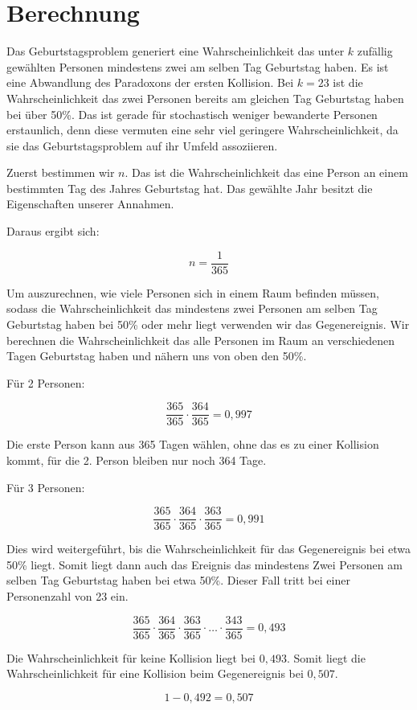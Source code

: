 \documentclass[../main.tex]{subfiles}
\begin{document}
    \section{Berechnung}

    Das Geburtstagsproblem generiert eine Wahrscheinlichkeit das unter \(k\) zufällig gewählten Personen mindestens zwei am
    selben Tag Geburtstag haben. Es ist eine Abwandlung des Paradoxons der ersten Kollision. \cite{henze} Bei \(k=23\) ist die
    Wahrscheinlichkeit das zwei Personen bereits am gleichen Tag Geburtstag haben bei über 50\%. Das ist gerade für
    stochastisch weniger bewanderte Personen erstaunlich, denn diese vermuten eine sehr viel geringere Wahrscheinlichkeit,
    da sie das Geburtstagsproblem auf ihr Umfeld assoziieren.

    Zuerst bestimmen wir \(n\).
    Das ist die Wahrscheinlichkeit das eine Person an einem bestimmten Tag des Jahres Geburtstag hat.
    Das gewählte Jahr besitzt die Eigenschaften unserer Annahmen.

    Daraus ergibt sich:

    \begin{equation}
        n = \frac{1}{365}
    \end{equation}

    Um auszurechnen, wie viele Personen sich in einem Raum befinden müssen, sodass die Wahrscheinlichkeit
    das mindestens zwei Personen am selben Tag Geburtstag haben bei 50\% oder mehr liegt verwenden wir das Gegenereignis.
    Wir berechnen die Wahrscheinlichkeit das alle Personen im Raum an verschiedenen Tagen Geburtstag haben und nähern uns
    von oben den 50\%.

    Für 2 Personen:

    \begin{equation}
        \frac{365}{365} \cdot \frac{364}{365} = 0,997
    \end{equation}

    Die erste Person kann aus 365 Tagen wählen, ohne das es zu einer Kollision kommt, für die 2. Person bleiben nur noch 364 Tage.

    Für 3 Personen:

    \begin{equation}
        \frac{365}{365} \cdot \frac{364}{365} \cdot \frac{363}{365} = 0,991
    \end{equation}

    Dies wird weitergeführt, bis die Wahrscheinlichkeit für das Gegenereignis bei etwa 50\% liegt.
    Somit liegt dann auch das Ereignis das mindestens Zwei Personen am selben Tag Geburtstag haben bei etwa 50\%.
    Dieser Fall tritt bei einer Personenzahl von 23 ein.

    \begin{equation}
        \frac{365}{365} \cdot \frac{364}{365} \cdot \frac{363}{365} \cdot \dots \cdot \frac{343}{365} = 0,493
    \end{equation}

    Die Wahrscheinlichkeit für keine Kollision liegt bei $0,493$.
    Somit liegt die Wahrscheinlichkeit für eine Kollision beim Gegenereignis bei $0,507$.

    \begin{equation}
        1-0,492 = 0,507
    \end{equation}
\end{document}
